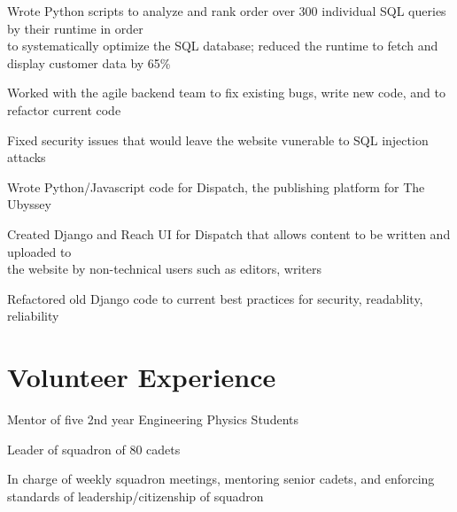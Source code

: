 \documentclass[]{deedy-resume-openfont}
\begin{document}
\begin{tightemize}
	\item Wrote Python scripts to analyze and rank order over 300 individual SQL queries by their runtime in order \\ to systematically optimize the SQL database; reduced the runtime to fetch and display customer data by 65\%
	\item Worked with the agile backend team to fix existing bugs, write new code, and to refactor current code
	\item Fixed security issues that would leave the website vunerable to SQL injection attacks
\end{tightemize}
\vspace{8pt}

\begin{tightemize}
	\item Wrote Python/Javascript code for Dispatch, the publishing platform for The Ubyssey
	\item Created Django and Reach UI for Dispatch that allows content to be written and uploaded to \\ the website by non-technical users such as editors, writers
	\item Refactored old Django code to current best practices for security, readablity, reliability
\end{tightemize}
\vspace{10pt}

\section{Volunteer Experience}
\begin{tightemize}
	\item Mentor of five 2nd year Engineering Physics Students
\end{tightemize}
\vspace{8pt}

\begin{tightemize}
	\item Leader of squadron of 80 cadets
	\item In charge of weekly squadron meetings, mentoring senior cadets, and enforcing standards of leadership/citizenship of squadron
\end{tightemize}
\vspace{10pt}
\end{document}
